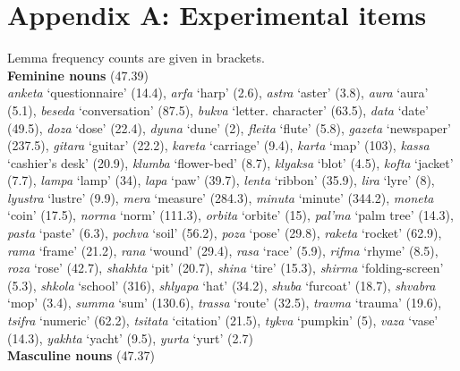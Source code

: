 \documentclass[output=paper, modfonts,newtxmath,hidelinks]{langscibook}
\begin{document}

\clearpage
{
\sloppy
\printbibliography[heading=subbibliography,notkeyword=this]
}
\section*{Appendix A: Experimental items}

Lemma frequency counts are given in brackets.\\

\noindent \textbf{Feminine nouns} (47.39)\\

\noindent \textit{anketa} `questionnaire' (14.4),
\textit{arfa} `harp' (2.6),
\textit{astra} `aster' (3.8),
\textit{aura} `aura' (5.1),
\textit{beseda} `conversation' (87.5),
\textit{bukva} `letter. character' (63.5),
\textit{data} `date' (49.5),
\textit{doza} `dose' (22.4),
\textit{dyuna} `dune' (2),
\textit{fleita} `flute' (5.8),
\textit{gazeta} `newspaper' (237.5),
\textit{gitara} `guitar' (22.2),
\textit{kareta} `carriage' (9.4),
\textit{karta} `map' (103),
\textit{kassa} `cashier's desk' (20.9),
\textit{klumba} `flower-bed' (8.7),
\textit{klyaksa} `blot' (4.5),
\textit{kofta} `jacket' (7.7),
\textit{lampa} `lamp' (34),
\textit{lapa} `paw' (39.7),
\textit{lenta} `ribbon' (35.9),
\textit{lira} `lyre' (8),
\textit{lyustra} `lustre' (9.9),
\textit{mera} `measure' (284.3),
\textit{minuta} `minute' (344.2),
\textit{moneta} `coin' (17.5),
\textit{norma} `norm' (111.3),
\textit{orbita} `orbite' (15),
\textit{pal'ma} `palm tree' (14.3),
\textit{pasta} `paste' (6.3),
\textit{pochva} `soil' (56.2),
\textit{poza} `pose' (29.8),
\textit{raketa} `rocket' (62.9),
\textit{rama} `frame' (21.2),
\textit{rana} `wound' (29.4),
\textit{rasa} `race' (5.9),
\textit{rifma} `rhyme' (8.5),
\textit{roza} `rose' (42.7),
\textit{shakhta} `pit' (20.7),
\textit{shina} `tire' (15.3),
\textit{shirma} `folding-screen' (5.3),
\textit{shkola} `school' (316),
\textit{shlyapa} `hat' (34.2),
\textit{shuba} `furcoat' (18.7),
\textit{shvabra} `mop' (3.4),
\textit{summa} `sum' (130.6),
\textit{trassa} `route' (32.5),
\textit{travma} `trauma' (19.6),
\textit{tsifra} `numeric' (62.2),
\textit{tsitata} `citation' (21.5),
\textit{tykva} `pumpkin' (5),
\textit{vaza} `vase' (14.3),
\textit{yakhta} `yacht' (9.5),
\textit{yurta} `yurt' (2.7)\\

\noindent\textbf{Masculine nouns} (47.37)\\
\end{document}
